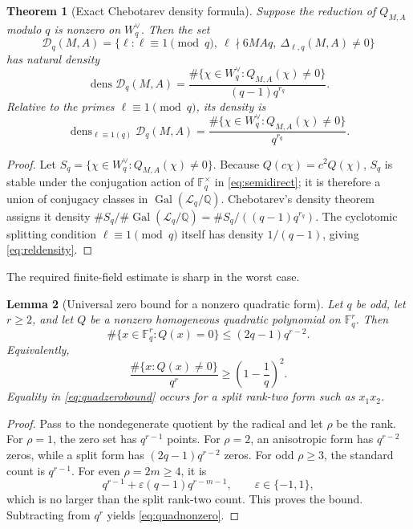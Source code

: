 \documentclass[11pt]{article}
\numberwithin{equation}{section}
\newtheorem{theorem}{Theorem}[section]
\newtheorem{lemma}[theorem]{Lemma}
\theoremstyle{definition}
\theoremstyle{remark}
\newcommand{\Q}{\mathbb Q}
\newcommand{\F}{\mathbb F}
\newcommand{\Gal}{\operatorname{Gal}}
\newcommand{\dens}{\operatorname{dens}}
\begin{document}
\begin{theorem}[Exact Chebotarev density formula]
\label{thm:densityexact}
Suppose the reduction of \(Q_{M,A}\) modulo \(q\) is nonzero on \(W_q^\vee\).  Then the set
\[
 \mathscr D_q(M,A)=
 \bigl\{\ell:\ell\equiv1\pmod q,\ \ell\nmid6MAq,
              \ \Delta_{\ell,q}(M,A)\ne0\bigr\}
\]
has natural density
\begin{equation}
 \dens\mathscr D_q(M,A)
 =\frac{\#\{\chi\in W_q^\vee:Q_{M,A}(\chi)\ne0\}}
        {(q-1)q^{r_q}}.\label{eq:absdensity}
\end{equation}
Relative to the primes \(\ell\equiv1\pmod q\), its density is
\begin{equation}
 \dens_{\ell\equiv1(q)}\mathscr D_q(M,A)
 =\frac{\#\{\chi\in W_q^\vee:Q_{M,A}(\chi)\ne0\}}
        {q^{r_q}}.\label{eq:reldensity}
\end{equation}
\end{theorem}

\begin{proof}
Let
\(S_q=\{\chi\in W_q^\vee:Q_{M,A}(\chi)\ne0\}\).
Because \(Q(c\chi)=c^2Q(\chi)\), \(S_q\) is stable under the conjugation action of
\(\F_q^\times\) in \eqref{eq:semidirect}; it is therefore a union of conjugacy classes in
\(\Gal(\mathcal L_q/\Q)\).  Chebotarev's density theorem \cite{MilneANT,SerreCheb} assigns it density
\(\#S_q/\#\Gal(\mathcal L_q/\Q)=\#S_q/((q-1)q^{r_q})\).  The cyclotomic splitting
condition \(\ell\equiv1\pmod q\) itself has density \(1/(q-1)\), giving
\eqref{eq:reldensity}.
\end{proof}

The required finite-field estimate is sharp in the worst case.

\begin{lemma}[Universal zero bound for a nonzero quadratic form]
\label{lem:quadzeros}
Let \(q\) be odd, let \(r\ge2\), and let \(Q\) be a nonzero homogeneous quadratic
polynomial on \(\F_q^r\).  Then
\begin{equation}
 \#\{x\in\F_q^r:Q(x)=0\}\le(2q-1)q^{r-2}.\label{eq:quadzerobound}
\end{equation}
Equivalently,
\begin{equation}
 \frac{\#\{x:Q(x)\ne0\}}{q^r}
 \ge\left(1-\frac1q\right)^2.\label{eq:quadnonzero}
\end{equation}
Equality in \eqref{eq:quadzerobound} occurs for a split rank-two form such as \(x_1x_2\).
\end{lemma}

\begin{proof}
Pass to the nondegenerate quotient by the radical and let \(\rho\) be the rank.  For
\(\rho=1\), the zero set has \(q^{r-1}\) points.  For \(\rho=2\), an anisotropic form has
\(q^{r-2}\) zeros, while a split form has
\((2q-1)q^{r-2}\) zeros.  For odd \(\rho\ge3\), the standard count is \(q^{r-1}\).  For
even \(\rho=2m\ge4\), it is
\[
 q^{r-1}+\varepsilon(q-1)q^{r-m-1},\qquad \varepsilon\in\{-1,1\},
\]
which is no larger than the split rank-two count.  This proves the bound.  Subtracting from
\(q^r\) yields \eqref{eq:quadnonzero}.
\end{proof}
\end{document}
